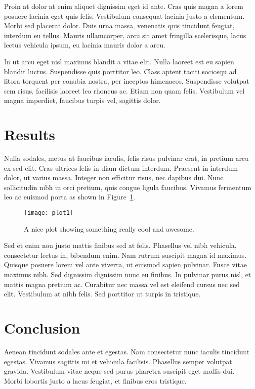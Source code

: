 \documentclass[9pt]{IEEEtran}
\begin{document}
Proin at dolor at enim aliquet dignissim eget id ante. Cras quis magna a lorem posuere lacinia eget quis felis. Vestibulum consequat lacinia justo a elementum. Morbi sed placerat dolor. Duis urna massa, venenatis quis tincidunt feugiat, interdum eu tellus. Mauris ullamcorper, arcu sit amet fringilla scelerisque, lacus lectus vehicula ipsum, eu lacinia mauris dolor a arcu.

In ut arcu eget nisl maximus blandit a vitae elit. Nulla laoreet est eu sapien blandit luctus. Suspendisse quis porttitor leo. Class aptent taciti sociosqu ad litora torquent per conubia nostra, per inceptos himenaeos. Suspendisse volutpat sem risus, facilisis laoreet leo rhoncus ac. Etiam non quam felis. Vestibulum vel magna imperdiet, faucibus turpis vel, sagittis dolor.

\section{Results}
Nulla sodales, metus at faucibus iaculis, felis risus pulvinar erat, in pretium arcu ex sed elit. Cras ultrices felis in diam dictum interdum. Praesent in interdum dolor, ut varius massa. Integer non efficitur risus, nec dapibus dui. Nunc sollicitudin nibh in orci pretium, quis congue ligula faucibus. Vivamus fermentum leo ac euismod porta as shown in Figure~\ref{fig:plot1}.

\begin{figure}[h]
    \centering
    \texttt{[image: plot1]}
    \caption{A nice plot showing something really cool and awesome.}
    \label{fig:plot1}
\end{figure}
 
Sed et enim non justo mattis finibus sed at felis. Phasellus vel nibh vehicula, consectetur lectus in, bibendum enim. Nam rutrum suscipit magna id maximus. Quisque posuere lorem vel ante viverra, ut euismod sapien pulvinar. Fusce vitae maximus nibh. Sed dignissim dignissim nunc eu finibus. In pulvinar purus nisl, et mattis magna pretium ac. Curabitur nec massa vel est eleifend cursus nec sed elit. Vestibulum at nibh felis. Sed porttitor ut turpis in tristique.

 \section{Conclusion}

Aenean tincidunt sodales ante et egestas. Nam consectetur nunc iaculis tincidunt egestas. Vivamus sagittis mi et vehicula facilisis. Phasellus semper volutpat gravida. Vestibulum vitae neque sed purus pharetra suscipit eget mollis dui. Morbi lobortis justo a lacus feugiat, et finibus eros tristique.



\end{document}
